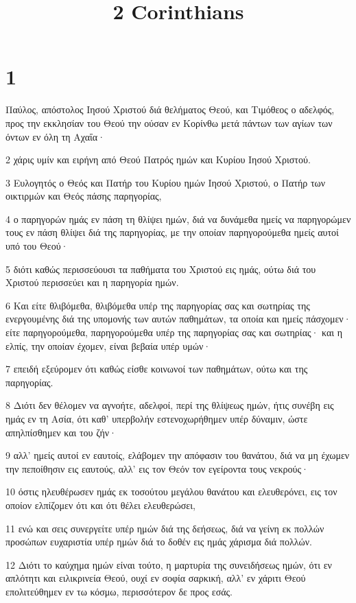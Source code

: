 

\title{2 Corinthians}


\chapter{1}

\par Παύλος, απόστολος Ιησού Χριστού διά θελήματος Θεού, και Τιμόθεος ο αδελφός, προς την εκκλησίαν του Θεού την ούσαν εν Κορίνθω μετά πάντων των αγίων των όντων εν όλη τη Αχαΐα·
\par 2 χάρις υμίν και ειρήνη από Θεού Πατρός ημών και Κυρίου Ιησού Χριστού.
\par 3 Ευλογητός ο Θεός και Πατήρ του Κυρίου ημών Ιησού Χριστού, ο Πατήρ των οικτιρμών και Θεός πάσης παρηγορίας,
\par 4 ο παρηγορών ημάς εν πάση τη θλίψει ημών, διά να δυνάμεθα ημείς να παρηγορώμεν τους εν πάση θλίψει διά της παρηγορίας, με την οποίαν παρηγορούμεθα ημείς αυτοί υπό του Θεού·
\par 5 διότι καθώς περισσεύουσι τα παθήματα του Χριστού εις ημάς, ούτω διά του Χριστού περισσεύει και η παρηγορία ημών.
\par 6 Και είτε θλιβόμεθα, θλιβόμεθα υπέρ της παρηγορίας σας και σωτηρίας της ενεργουμένης διά της υπομονής των αυτών παθημάτων, τα οποία και ημείς πάσχομεν· είτε παρηγορούμεθα, παρηγορούμεθα υπέρ της παρηγορίας σας και σωτηρίας· και η ελπίς, την οποίαν έχομεν, είναι βεβαία υπέρ υμών·
\par 7 επειδή εξεύρομεν ότι καθώς είσθε κοινωνοί των παθημάτων, ούτω και της παρηγορίας.
\par 8 Διότι δεν θέλομεν να αγνοήτε, αδελφοί, περί της θλίψεως ημών, ήτις συνέβη εις ημάς εν τη Ασία, ότι καθ' υπερβολήν εστενοχωρήθημεν υπέρ δύναμιν, ώστε απηλπίσθημεν και του ζήν·
\par 9 αλλ' ημείς αυτοί εν εαυτοίς, ελάβομεν την απόφασιν του θανάτου, διά να μη έχωμεν την πεποίθησιν εις εαυτούς, αλλ' εις τον Θεόν τον εγείροντα τους νεκρούς·
\par 10 όστις ηλευθέρωσεν ημάς εκ τοσούτου μεγάλου θανάτου και ελευθερόνει, εις τον οποίον ελπίζομεν ότι και ότι θέλει ελευθερώσει,
\par 11 ενώ και σεις συνεργείτε υπέρ ημών διά της δεήσεως, διά να γείνη εκ πολλών προσώπων ευχαριστία υπέρ ημών διά το δοθέν εις ημάς χάρισμα διά πολλών.
\par 12 Διότι το καύχημα ημών είναι τούτο, η μαρτυρία της συνειδήσεως ημών, ότι εν απλότητι και ειλικρινεία Θεού, ουχί εν σοφία σαρκική, αλλ' εν χάριτι Θεού επολιτεύθημεν εν τω κόσμω, περισσότερον δε προς εσάς.
